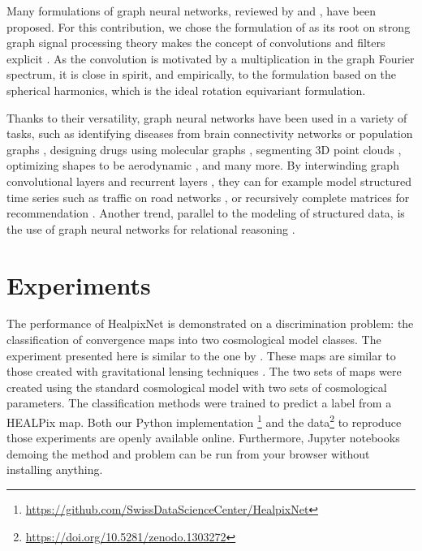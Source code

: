 \documentclass[final,twocolumn,3p,times,sort&compress]{elsarticle}
\newcommand{\1}{\b{1}}              %
\newcommand{\0}{\b{0}}              %
\begin{document}
Many formulations of graph neural networks, reviewed by \citep{bronstein2017review} and \citep{hamilton2017review}, have been proposed.
For this contribution, we chose the formulation of \citep{defferrard2016convolutional} as its root on strong graph signal processing theory makes the concept of convolutions and filters explicit \citep{shuman2013emerging}.
As the convolution is motivated by a multiplication in the graph Fourier spectrum, it is close in spirit, and empirically, to the formulation based on the spherical harmonics, which is the ideal rotation equivariant formulation.


Thanks to their versatility, graph neural networks have been used in a variety of tasks, such as identifying diseases from brain connectivity networks \citep{ktena2018metriclearning} or population graphs \citep{parisot2017disease}, designing drugs using molecular graphs \citep{hop2018drugdesign}, segmenting 3D point clouds \citep{qi2017pointcloudsegmentation}, optimizing shapes to be aerodynamic \citep{baque2018shape}, and many more.
By interwinding graph convolutional layers and recurrent layers \citep{seo2016gcrn}, they can for example model structured time series such as traffic on road networks \citep{li2018traffic}, or recursively complete matrices for recommendation \citep{monti2017recommendation}.
Another trend, parallel to the modeling of structured data, is the use of graph neural networks for relational reasoning \citep{battaglia2018review}.

\section{Experiments}
\label{sec:experiments}

The performance of HealpixNet is demonstrated on a discrimination problem: the classification of convergence maps into two cosmological model classes.
The experiment presented here is similar to the one by \citep{schmelze2017cosmologicalmodel}.
These maps are similar to those created with gravitational lensing techniques \citep{chang2017curvedsky}.
The two sets of maps were created using the standard cosmological model with two sets of cosmological parameters.
The classification methods were trained to predict a label from a HEALPix map.
Both our Python implementation{ \footnote{\url{https://github.com/SwissDataScienceCenter/HealpixNet}}} and the data\footnote{\url{https://doi.org/10.5281/zenodo.1303272}} to reproduce those experiments are openly available online. Furthermore, Jupyter notebooks demoing the method and problem can be run from your browser without installing anything.
\end{document}
